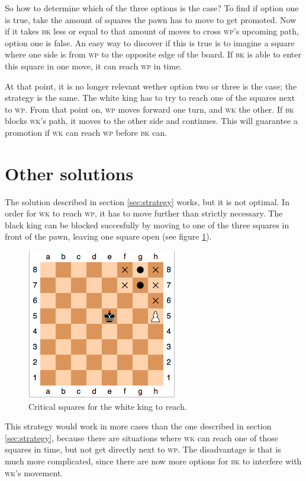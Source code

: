 \documentclass[titlepage,a4paper, 11pt]{article}
\newcommand{\bk}{\textsc{bk}\xspace}
\newcommand{\wk}{\textsc{wk}\xspace}
\renewcommand{\wp}{\textsc{wp}\xspace}
\begin{document}
So how to determine which of the three options is the case? To find if option one is true, take the amount
of squares the pawn has to move to get promoted. Now if it takes \bk less or equal to that amount of moves
to cross \wp's upcoming path, option one is false. An easy way to discover if this is true is to imagine
a square where one side is from \wp to the opposite edge of the board. If \bk is able to enter this square
in one move, it can reach \wp in time.

At that point, it is no longer relevant wether option two or three is the case; the strategy is the same.
The white king has to try to reach one of the squares next to \wp. From that point on, \wp moves forward
one turn, and \wk the other. If \bk blocks \wk's path, it moves to the other side and continues. This
will guarantee a promotion if \wk can reach \wp before \bk can.

\section{Other solutions}
\label{sec:other}
The solution described in section \ref{sec:strategy} works, but it is not optimal. In order for \wk to
reach \wp, it has to move further than strictly necessary. The black king can be blocked succesfully by
moving to one of the three squares in front of the pawn, leaving one square open (see figure 
\ref{fig:keysquares}). 
\begin{figure}[htb]
\centering
\includegraphics[scale = 0.65]{keysquares.png}
\caption{Critical squares for the white king to reach.}
\label{fig:keysquares}
\end{figure}
This strategy would work in more cases than the one described in section
\ref{sec:strategy}, because there are situations where \wk can reach one of those squares in time, but
not get directly next to \wp. The disadvantage is that is much more complicated, since there are now
more options for \bk to interfere with \wk's movement.
\end{document}
